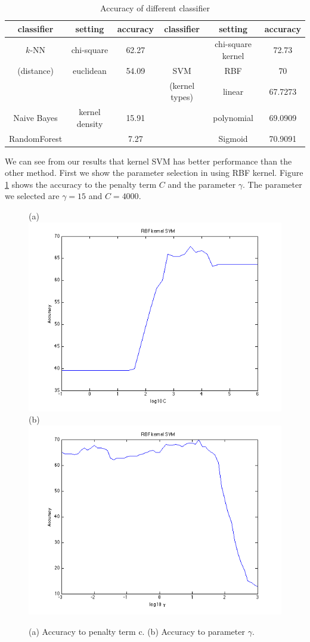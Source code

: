 \documentclass[12pt,peerreview,letterpaper]{IEEEtran}
\begin{document}
\begin{table}[t]
\caption{Accuracy of different classifier}
\begin{center}
\label{tbl:classifers}
\begin{tabular}{|c|c|c|c|c|c|}
\hline
   classifier  & setting      &accuracy   & classifier    & setting      & accuracy\\
\hline
$k$-NN     & chi-square    &62.27      &     &chi-square kernel  &72.73\\ \cline{2-3} \cline{5-6}
(distance) & euclidean     &54.09      &   SVM    & RBF               &70\\ \cline{1-3} \cline{5-6}
       &               &     &    (kernel types)    & linear            &67.7273\\ \cline{1-3} \cline{5-6}
Naive Bayes  & kernel density  & 15.91           &       & polynomial        &69.0909\\ \cline{1-3} \cline{5-6}
 RandomForest &         & 7.27                 &       & Sigmoid           &70.9091\\ \hline
\end{tabular}
\end{center}
\end{table}

We can see from our results that kernel SVM has better performance than the other method. First we show the parameter selection in using RBF kernel. Figure \ref{fig:RBF} shows the accuracy to the penalty term $C$ and the parameter $\gamma$. The parameter we selected are $\gamma = 15$ and $C = 4000$.

\begin{figure}[ht!]
    \centering
    {(a)\includegraphics[width=0.38\linewidth]{../Figure/RBF_cost_accuracy}
    (b)\includegraphics[width=0.38\linewidth]{../Figure/RBF_gamma_accuracy}}
    \caption{(a) Accuracy to penalty term c. (b) Accuracy to parameter $\gamma$. }
    \label{fig:RBF}
\end{figure}
\end{document}
